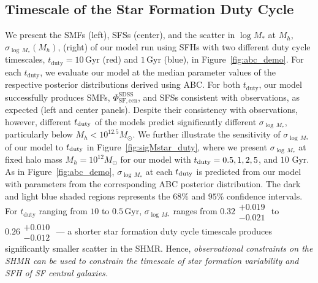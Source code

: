 \documentclass[12pt, letterpaper, preprint, tighten]{aastex62}
\begin{document}
\subsection{Timescale of the Star Formation Duty Cycle} \label{sec:sfdutycycle}
We present the SMFs (left), SFSs (center), and the scatter in $\log M_*$ at $M_h$, 
$\sigma_{\log\,M_*}(M_h)$, (right) of our model run using SFHs with 
two different duty cycle timescales, $t_\mathrm{duty} = 10\,\mathrm{Gyr}$ (red) 
and $1\,\mathrm{Gyr}$ (blue), in Figure~\ref{fig:abc_demo}. For each 
$t_\mathrm{duty}$, we evaluate our model at the median parameter values of the respective posterior distributions derived 
using ABC. For both $t_\mathrm{duty}$, our model successfully produces SMFs, 
$\Phi^\mathrm{SDSS}_\mathrm{SF,cen}$, and SFSs consistent with observations, 
as expected (left and center panels). Despite their consistency with observations, 
however, different $t_{\rm duty}$ of the models predict significantly different 
$\sigma_{\log\,M_*}$, particularly below $M_h < 10^{12.5}M_\odot$. We further
illustrate the sensitivity of $\sigma_{\log\,M_*}$ of our model to $t_{\rm duty}$
in Figure~\ref{fig:sigMstar_duty}, where we present $\sigma_{\log\,M_*}$ at
fixed halo mass $M_h = 10^{12} M_\odot$ for our model with $t_{\rm duty} = 0.5, 1, 2, 5$, 
and $10$ Gyr. As in Figure~\ref{fig:abc_demo}, $\sigma_{\log\,M_*}$ at each $t_{\rm duty}$ 
is predicted from our model with parameters from the corresponding ABC posterior 
distribution. The dark and light blue shaded regions represents the $68\%$ and $95\%$ 
confidence intervals. For $t_\mathrm{duty}$ ranging from $10$ to $0.5\,\mathrm{Gyr}$,
$\sigma_{\log\,M_*}$ ranges from 
$0.32\substack{+0.019\\ -0.021}$ to $0.26\substack{+0.010\\-0.012}$
--- a shorter star formation duty cycle timescale produces significantly 
smaller scatter in the SHMR. Hence, \emph{observational constraints on 
the SHMR can be used to constrain the timescale of star formation variability 
and SFH of SF central galaxies.} 
\end{document}
